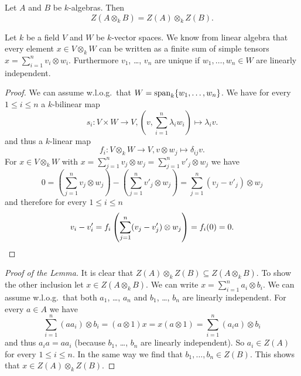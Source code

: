 \begin{lem}\label{lem: Z(A o B) = Z(A) o Z(B)}
  Let $A$ and $B$ be $k$-algebras. Then
  \[
    Z(A \otimes_k B) = Z(A) \otimes_k Z(B).
  \]
\end{lem}


\begin{rec}
  Let $k$ be a field $V$ and $W$ be $k$-vector spaces. We know from linear algebra that every element $x \in V \otimes_k W$ can be written as a finite sum of simple tensors $x = \sum_{i=1}^n v_i \otimes w_i$. Furthermore $v_1$, \dots, $v_n$ are unique if $w_1, \dotsc, w_n \in W$ are linearly independent.
  \begin{proof}
    We can assume w.l.o.g.\ that $W = \operatorname{span}_k \{w_1, \dotsc, w_n\}$. We have for every $1 \leq i \leq n$ a $k$-bilinear map
    \[
      s_i \colon V \times W \to V, \left(v, \sum_{i=1}^n \lambda_i w_i\right) \mapsto \lambda_i v.
    \]
    and thus a $k$-linear map
    \[
      f_i \colon V \otimes_k W \to V, v \otimes w_j \mapsto \delta_{ij} v.
    \]
    For $x \in V \otimes_k W$ with $x = \sum_{j=1}^n v_j \otimes w_j = \sum_{j=1}^n v'_j \otimes w_j$ we have
    \[
      0
      = \left( \sum_{j=1}^n v_j \otimes w_j \right) - \left( \sum_{j=1}^n v'_j \otimes w_j \right)
      = \sum_{j=1}^n (v_j - v'_j) \otimes w_j
    \]
    and therefore for every $1 \leq i \leq n$
    \[
      v_i - v'_i = f_i\left( \sum_{j=1}^n (v_j - v'_j) \otimes w_j\right) = f_i(0) = 0.
      \qedhere
    \]
  \end{proof}
\end{rec}


\begin{proof}[Proof of the Lemma]
  It is clear that $Z(A) \otimes_k Z(B) \subseteq Z(A \otimes_k B)$. To show the other inclusion let $x \in Z(A \otimes_k B)$. We can write $x = \sum_{i=1}^n a_i \otimes b_i$. We can assume w.l.o.g.\ that both $a_1$, \dots, $a_n$ and $b_1$, \dots, $b_n$ are linearly independent. For every $a \in A$ we have
  \[
    \sum_{i=1}^n (a a_i) \otimes b_i
    = (a \otimes 1) x
    = x (a \otimes 1)
    = \sum_{i=1}^n (a_i a) \otimes b_i
  \]
  and thus $a_i a = a a_i$ (because $b_1$, \dots, $b_n$ are linearly independent). So $a_i \in Z(A)$ for every $1 \leq i \leq n$. In the same way we find that $b_1, \dotsc, b_n \in Z(B)$. This shows that $x \in Z(A) \otimes_k Z(B)$.
\end{proof}


